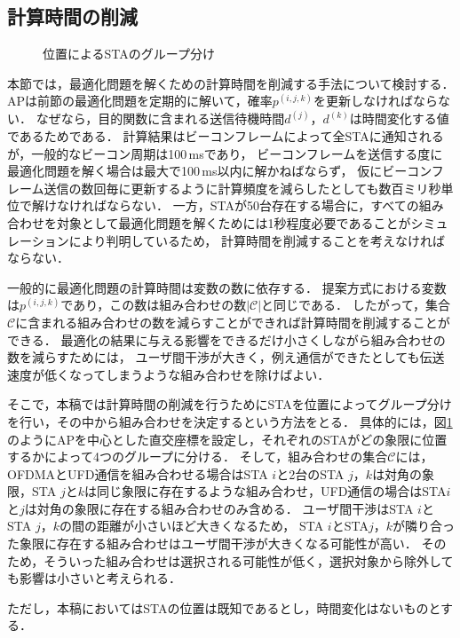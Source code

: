 \documentclass[technicalreport]{ieicej}
\newcommand{\pijk}{p^{(i,j,k)}}
\newcommand{\mthc}{\mathcal C}
\begin{document}
	\subsection{計算時間の削減}\label{sec:time}
		\begin{figure}[t]
			\centering
			\caption{位置によるSTAのグループ分け}
			\label{fig:time_image}
		\end{figure}
		本節では，最適化問題を解くための計算時間を削減する手法について検討する．
		APは前節の最適化問題を定期的に解いて，確率$\pijk$を更新しなければならない．
		なぜなら，目的関数に含まれる送信待機時間$d^{(j)}$，$d^{(k)}$は時間変化する値であるためである．
		計算結果はビーコンフレームによって全STAに通知されるが，一般的なビーコン周期は100\,msであり，
		ビーコンフレームを送信する度に最適化問題を解く場合は最大で100\,ms以内に解かねばならず，
		仮にビーコンフレーム送信の数回毎に更新するように計算頻度を減らしたとしても数百ミリ秒単位で解けなければならない．
		一方，STAが50台存在する場合に，すべての組み合わせを対象として最適化問題を解くためには1秒程度必要であることがシミュレーションにより判明しているため，
		計算時間を削減することを考えなければならない．
		\par
		一般的に最適化問題の計算時間は変数の数に依存する．
		提案方式における変数は$\pijk$であり，この数は組み合わせの数$|\mthc|$と同じである．
		したがって，集合$\mthc$に含まれる組み合わせの数を減らすことができれば計算時間を削減することができる．
		最適化の結果に与える影響をできるだけ小さくしながら組み合わせの数を減らすためには，
		ユーザ間干渉が大きく，例え通信ができたとしても伝送速度が低くなってしまうような組み合わせを除けばよい．
		\par
		そこで，本稿では計算時間の削減を行うためにSTAを位置によってグループ分けを行い，その中から組み合わせを決定するという方法をとる．
		具体的には，図\ref{fig:time_image}のようにAPを中心とした直交座標を設定し，それぞれのSTAがどの象限に位置するかによって4つのグループに分ける．
		そして，組み合わせの集合$\mthc$には，OFDMAとUFD通信を組み合わせる場合はSTA $i$と2台のSTA $j$，$k$は対角の象限，STA $j$と$k$は同じ象限に存在するような組み合わせ，UFD通信の場合はSTA$i$と$j$は対角の象限に存在する組み合わせのみ含める．
		ユーザ間干渉はSTA $i$とSTA $j$，$k$の間の距離が小さいほど大きくなるため，
		STA $i$とSTA$j$，$k$が隣り合った象限に存在する組み合わせはユーザ間干渉が大きくなる可能性が高い．
		そのため，そういった組み合わせは選択される可能性が低く，選択対象から除外しても影響は小さいと考えられる．
		\par
		ただし，本稿においてはSTAの位置は既知であるとし，時間変化はないものとする．
\end{document}
